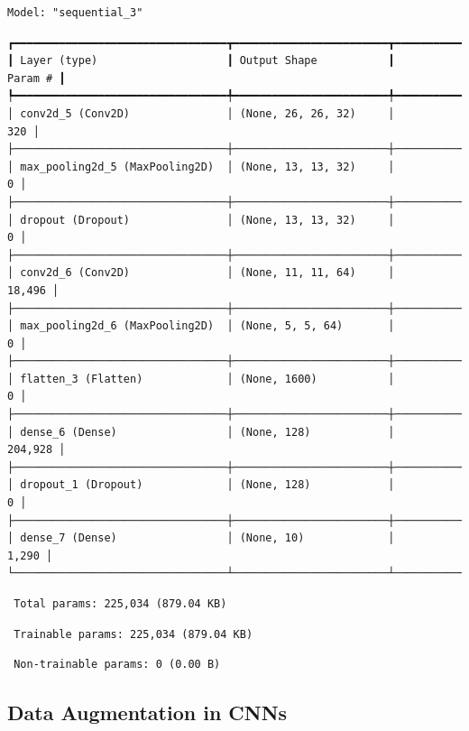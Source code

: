 \documentclass[
  letterpaper,
  DIV=11,
  numbers=noendperiod]{scrreprt}
\begin{document}
\begin{verbatim}
Model: "sequential_3"
\end{verbatim}

\begin{verbatim}
┏━━━━━━━━━━━━━━━━━━━━━━━━━━━━━━━━━┳━━━━━━━━━━━━━━━━━━━━━━━━┳━━━━━━━━━━━━━━━┓
┃ Layer (type)                    ┃ Output Shape           ┃       Param # ┃
┡━━━━━━━━━━━━━━━━━━━━━━━━━━━━━━━━━╇━━━━━━━━━━━━━━━━━━━━━━━━╇━━━━━━━━━━━━━━━┩
│ conv2d_5 (Conv2D)               │ (None, 26, 26, 32)     │           320 │
├─────────────────────────────────┼────────────────────────┼───────────────┤
│ max_pooling2d_5 (MaxPooling2D)  │ (None, 13, 13, 32)     │             0 │
├─────────────────────────────────┼────────────────────────┼───────────────┤
│ dropout (Dropout)               │ (None, 13, 13, 32)     │             0 │
├─────────────────────────────────┼────────────────────────┼───────────────┤
│ conv2d_6 (Conv2D)               │ (None, 11, 11, 64)     │        18,496 │
├─────────────────────────────────┼────────────────────────┼───────────────┤
│ max_pooling2d_6 (MaxPooling2D)  │ (None, 5, 5, 64)       │             0 │
├─────────────────────────────────┼────────────────────────┼───────────────┤
│ flatten_3 (Flatten)             │ (None, 1600)           │             0 │
├─────────────────────────────────┼────────────────────────┼───────────────┤
│ dense_6 (Dense)                 │ (None, 128)            │       204,928 │
├─────────────────────────────────┼────────────────────────┼───────────────┤
│ dropout_1 (Dropout)             │ (None, 128)            │             0 │
├─────────────────────────────────┼────────────────────────┼───────────────┤
│ dense_7 (Dense)                 │ (None, 10)             │         1,290 │
└─────────────────────────────────┴────────────────────────┴───────────────┘
\end{verbatim}

\begin{verbatim}
 Total params: 225,034 (879.04 KB)
\end{verbatim}

\begin{verbatim}
 Trainable params: 225,034 (879.04 KB)
\end{verbatim}

\begin{verbatim}
 Non-trainable params: 0 (0.00 B)
\end{verbatim}

\subsection{Data Augmentation in CNNs}\label{data-augmentation-in-cnns}
\end{document}
